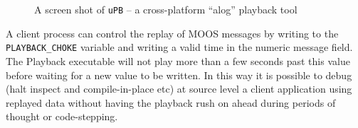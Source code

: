 \documentclass[a4paper,10pt]{article}
\newcommand{\Code}[1]{\texttt{#1} }
\newcommand{\code}[1]{\Code{#1} }
\begin{document}
\begin{figure}
\center {} \caption{A
screen shot of \code{uPB} -- a cross-platform ``alog'' playback
tool}
\end{figure}

A client process can control the replay of MOOS messages by
writing to the \code{PLAYBACK\_CHOKE} variable and writing a valid
time in the numeric message field. The Playback executable will
not play more than a few seconds past this value before waiting
for a new value to be written. In this way  it is possible to
debug (halt inspect and compile-in-place etc) at source level a
client application using replayed data without having the playback
rush on ahead during periods of thought or code-stepping.
\end{document}
